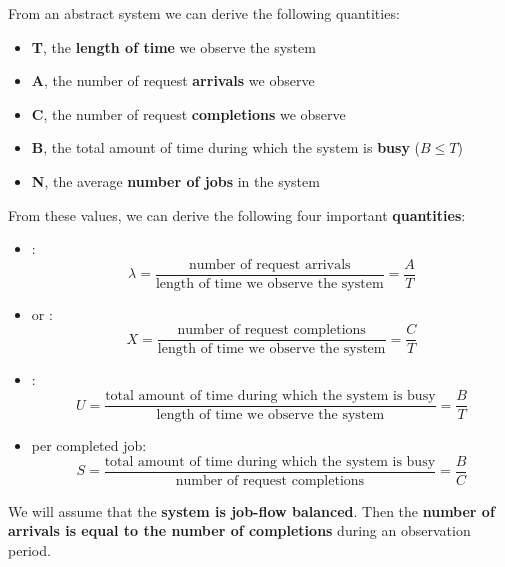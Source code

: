 From an abstract system we can derive the following quantities:
\begin{itemize}
	\item \textbf{T}, the \textbf{length of time} we observe the system
	\item \textbf{A}, the number of request \textbf{arrivals} we observe
	\item \textbf{C}, the number of request \textbf{completions} we observe
	\item \textbf{B}, the total amount of time during which the system is \textbf{busy} ($B \le T$)
	\item \textbf{N}, the average \textbf{number of jobs} in the system
\end{itemize}
From these values, we can derive the following four important \textbf{quantities}:
\begin{itemize}
	\item {}:
	\begin{equation}\label{eq: arrival rate}
		\lambda = \dfrac{\text{number of request arrivals}}{\text{length of time we observe the system}} = \dfrac{A}{T}
	\end{equation}
	
	\item {} or :
	\begin{equation}\label{eq: Throughput}
		X = \dfrac{\text{number of request completions}}{\text{length of time we observe the system}} = \dfrac{C}{T}
	\end{equation}
	
	\item {}:
	\begin{equation}
		U = \dfrac{\text{total amount of time during which the system is busy}}{\text{length of time we observe the system}} = \dfrac{B}{T}
	\end{equation}
	
	\item {} per completed job:
	\begin{equation}
		S = \dfrac{\text{total amount of time during which the system is busy}}{\text{number of request completions}} = \dfrac{B}{C}
	\end{equation}
\end{itemize}
We will assume that the \textbf{system is job-flow balanced}. Then the \textbf{number of arrivals is equal to the number of completions} during an observation period.

